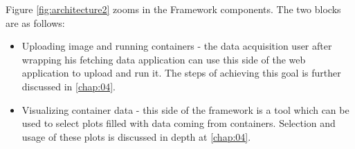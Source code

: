 Figure \ref{fig:architecture2} zooms in the Framework components. The two blocks are as follows:
\begin{itemize}
	\item Uploading image and running containers - the data acquisition user after wrapping his fetching data application can use this side of the web application to upload and run it. The steps of achieving this goal is further discussed in \autoref{chap:04}.
	\item Visualizing container data - this side of the framework is a tool which can be used to select plots filled with data coming from containers. Selection and usage of these plots is discussed in depth at \autoref{chap:04}.
\end{itemize}

